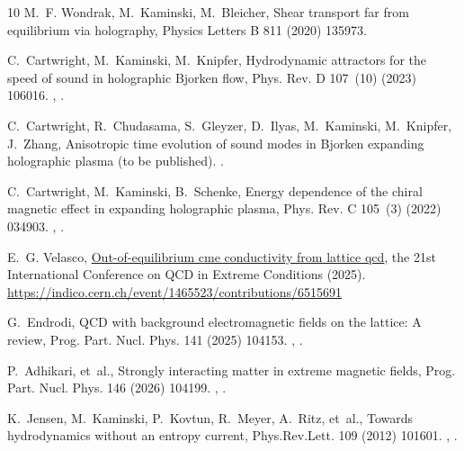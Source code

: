 \documentclass[preprint,12pt]{elsarticle}
\begin{document}
\begin{thebibliography}{10}
M.~F. Wondrak, M.~Kaminski, M.~Bleicher, Shear transport far from equilibrium
  via holography, Physics Letters B 811 (2020) 135973.

C.~Cartwright, M.~Kaminski, M.~Knipfer, {Hydrodynamic attractors for the speed
  of sound in holographic Bjorken flow}, Phys. Rev. D 107~(10) (2023) 106016.
\newblock \href {http://arxiv.org/abs/2207.02875} {},
  \href {https://doi.org/10.1103/PhysRevD.107.106016}
  {}.

C.~Cartwright, R.~Chudasama, S.~Gleyzer, D.~Ilyas, M.~Kaminski, M.~Knipfer,
  J.~Zhang, {Anisotropic time evolution of sound modes in Bjorken expanding
  holographic plasma} (to be published).
\newblock \href {http://arxiv.org/abs/2601.xxxxx} {}.

C.~Cartwright, M.~Kaminski, B.~Schenke, Energy dependence of the chiral
  magnetic effect in expanding holographic plasma, Phys. Rev. C 105~(3) (2022)
  034903.
\newblock \href {http://arxiv.org/abs/2112.13857} {},
  \href {https://doi.org/10.1103/PhysRevC.105.034903}
  {}.

E.~G. Velasco,
  \href{https://indico.cern.ch/event/1465523/contributions/6515691}{Out-of-equilibrium
  cme conductivity from lattice qcd}, the 21st International Conference on QCD
  in Extreme Conditions (2025).
\newline\urlprefix\url{https://indico.cern.ch/event/1465523/contributions/6515691}

G.~Endrodi, {QCD with background electromagnetic fields on the lattice: A
  review}, Prog. Part. Nucl. Phys. 141 (2025) 104153.
\newblock \href {http://arxiv.org/abs/2406.19780} {},
  \href {https://doi.org/10.1016/j.ppnp.2024.104153}
  {}.

P.~Adhikari, et~al., {Strongly interacting matter in extreme magnetic fields},
  Prog. Part. Nucl. Phys. 146 (2026) 104199.
\newblock \href {http://arxiv.org/abs/2412.18632} {},
  \href {https://doi.org/10.1016/j.ppnp.2025.104199}
  {}.

K.~Jensen, M.~Kaminski, P.~Kovtun, R.~Meyer, A.~Ritz, et~al., {Towards
  hydrodynamics without an entropy current}, Phys.Rev.Lett. 109 (2012) 101601.
\newblock \href {http://arxiv.org/abs/1203.3556} {},
  \href {https://doi.org/10.1103/PhysRevLett.109.101601}
  {}.


\end{thebibliography}
\end{document}
